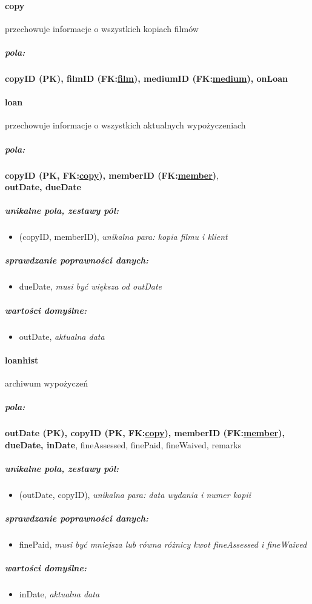 \documentclass[12pt,a4paper,titlepage]{article}
\begin{document}
\paragraph{copy} przechowuje informacje o wszystkich kopiach filmów
\subparagraph{pola:}
\textbf{copyID (PK), filmID (FK:\underline{film}), mediumID (FK:\underline{medium}), onLoan}

\paragraph{loan} przechowuje informacje o wszystkich aktualnych wypożyczeniach
\subparagraph{pola:}
\textbf{copyID (PK, FK:\underline{copy}), memberID (FK:\underline{member})}, \\\textbf{outDate, dueDate}
\subparagraph{unikalne pola, zestawy pól:}
\begin{itemize}
	\item (copyID, memberID), \textit{unikalna para: kopia filmu i klient}
\end{itemize}
\subparagraph{sprawdzanie poprawności danych:}
\begin{itemize}
	\item dueDate, \textit{musi być większa od outDate}
\end{itemize}
\subparagraph{wartości domyślne:}
\begin{itemize}
	\item outDate, \textit{aktualna data}
\end{itemize}

\paragraph{loanhist} archiwum wypożyczeń
\subparagraph{pola:}
\textbf{outDate (PK), copyID (PK, FK:\underline{copy}), memberID (FK:\underline{member}), dueDate, inDate}, fineAssessed, finePaid, fineWaived, remarks
\subparagraph{unikalne pola, zestawy pól:}
\begin{itemize}
	\item (outDate, copyID), \textit{unikalna para: data wydania i numer kopii}
\end{itemize}
\subparagraph{sprawdzanie poprawności danych:}
\begin{itemize}
	\item finePaid, \textit{musi być mniejsza lub równa różnicy kwot fineAssessed i fineWaived}
\end{itemize}
\subparagraph{wartości domyślne:}
\begin{itemize}
	\item inDate, \textit{aktualna data}
\end{itemize}
\end{document}
